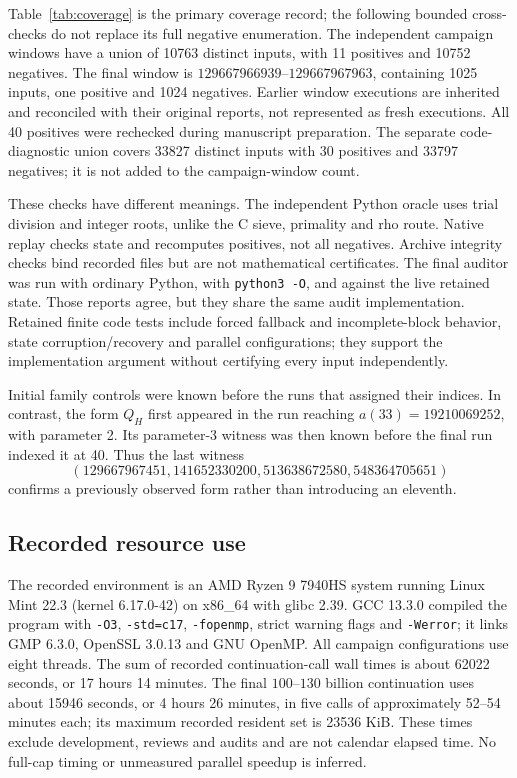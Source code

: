 \documentclass[11pt]{article}
\theoremstyle{definition}
\begin{document}
Table~\ref{tab:coverage} is the primary coverage record; the following
bounded cross-checks do not replace its full negative enumeration.
The independent campaign windows have a union of 10763 distinct inputs,
with 11 positives and 10752 negatives. The final window is
$129667966939$--$129667967963$, containing 1025 inputs, one positive and
1024 negatives. Earlier window executions are inherited and reconciled
with their original reports, not represented as fresh executions. All
40 positives were rechecked during manuscript preparation. The separate
code-diagnostic union covers 33827 distinct inputs with 30 positives and
33797 negatives; it is not added to the campaign-window count.

These checks have different meanings. The independent Python oracle uses
trial division and integer roots, unlike the C sieve, primality and rho
route. Native replay checks state and recomputes positives, not all
negatives. Archive integrity checks bind recorded files but are not
mathematical certificates. The final auditor was run with ordinary
Python, with \texttt{python3 -O}, and against the live retained state.
Those reports agree, but they share the same audit implementation. Retained
finite code tests include forced fallback and incomplete-block behavior,
state corruption/recovery and parallel configurations; they support the
implementation argument without certifying every input independently.

Initial family controls were known before the runs that assigned their
indices. In contrast, the form $Q_H$ first appeared in the run reaching
$a(33)=19210069252$, with parameter 2. Its parameter-3 witness was then
known before the final run indexed it at 40. Thus the last witness
\[
 (129667967451,141652330200,513638672580,548364705651)
\]
confirms a previously observed form rather than introducing an eleventh.

\subsection{Recorded resource use}
The recorded environment is an AMD Ryzen 9 7940HS system running Linux
Mint 22.3 (kernel 6.17.0-42) on x86\_64 with glibc 2.39. GCC 13.3.0 compiled the program
with \texttt{-O3}, \texttt{-std=c17}, \texttt{-fopenmp}, strict warning
flags and \texttt{-Werror}; it links GMP 6.3.0, OpenSSL 3.0.13 and
GNU OpenMP. All campaign configurations use eight threads.
The sum of recorded continuation-call wall times is about 62022 seconds,
or 17 hours 14 minutes. The final $100$--$130$ billion continuation uses
about 15946 seconds, or 4 hours 26 minutes, in five calls of approximately
52--54 minutes each; its maximum recorded resident set is 23536 KiB.
These times exclude development, reviews and audits and are not calendar
elapsed time. No full-cap timing or unmeasured parallel speedup is inferred.
\end{document}
